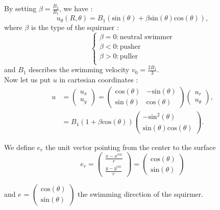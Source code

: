\documentclass{article}
\begin{document}
By setting $\beta=\frac{B_2}{B_1}$, we have :
$$
u_\theta(R,\theta) = B_1(\mathrm{sin}(\theta) + \beta \mathrm{sin}(\theta)\mathrm{cos}(\theta)),
$$
where $\beta$ is the type of the squirmer :
$$\left\{
    \begin{array}{ll}
        \beta = 0 : \text{neutral swimmer}  \\
        \beta < 0 : \mathrm{pusher} \\
        \beta > 0 : \mathrm{puller} \\
    \end{array}
\right.$$
and $B_1$ describes the swimming velocity $v_0 = \frac{2 B_1}{3}$.
\\ Now let us put $u$ in cartesian coordinates :
\begin{align*}
    u &= \begin{pmatrix}
   u_x \\
   u_y
\end{pmatrix}
= \begin{pmatrix}
   \mathrm{cos}(\theta) & -\mathrm{sin}(\theta) \\
   \mathrm{sin}(\theta) & \mathrm{cos}(\theta)
\end{pmatrix}
\begin{pmatrix}
   u_r \\
   u_\theta
\end{pmatrix}, \\
&= B_1 (1 + \beta \mathrm{cos}(\theta))
\begin{pmatrix}
   -\mathrm{sin}^2(\theta) \\
   \mathrm{sin}(\theta)\mathrm{cos}(\theta)
\end{pmatrix}.
\end{align*}

We define $e_r$ the unit vector pointing from the center to the surface 
$$
e_r = \begin{pmatrix}
   \frac{x - x^{cm}}{r}  \\
   \frac{y - y^{cm}}{r} 
\end{pmatrix} = \begin{pmatrix}
   \mathrm{cos}(\theta) \\
   \mathrm{sin}(\theta)
\end{pmatrix}$$ 

and $e$ = 
$\begin{pmatrix}
   \mathrm{cos}(\theta) \\
   \mathrm{sin}(\theta) \end{pmatrix}$ the swimming direction of the squirmer. 
   
\end{document}
